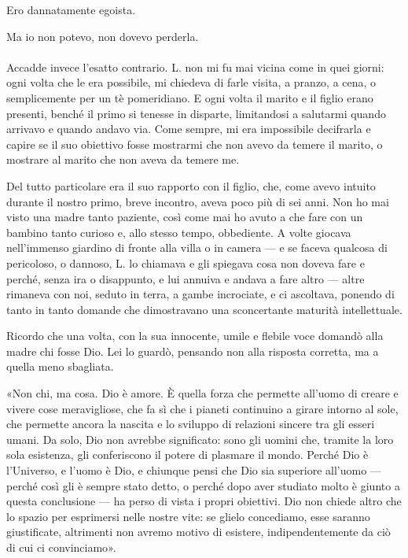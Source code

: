 \documentclass[a4paper,12pt]{book}
\begin{document}
Ero dannatamente egoista.

Ma io non potevo, non dovevo perderla.

\paragraph{}
Accadde invece l'esatto contrario. L. non mi fu mai vicina come in quei giorni:
ogni volta che le era possibile, mi chiedeva di farle visita, a pranzo, a cena,
o semplicemente per un tè pomeridiano. E ogni volta il marito e il figlio erano
presenti, benché il primo si tenesse in disparte, limitandosi a salutarmi quando
arrivavo e quando andavo via. Come sempre, mi era impossibile decifrarla e capire
se il suo obiettivo fosse mostrarmi che non avevo da temere il marito, o mostrare
al marito che non aveva da temere me.

Del tutto particolare era il suo rapporto con il figlio, che, come avevo intuito
durante il nostro primo, breve incontro, aveva poco più di sei anni. Non ho mai
visto una madre tanto paziente, così come mai ho avuto a che fare con un bambino
tanto curioso e, allo stesso tempo, obbediente. A volte giocava nell'immenso
giardino di fronte alla villa o in camera --- e se faceva qualcosa di pericoloso,
o dannoso, L. lo chiamava e gli spiegava cosa non doveva fare e perché, senza
ira o disappunto, e lui annuiva e andava a fare altro --- altre rimaneva con noi,
seduto in terra, a gambe incrociate, e ci ascoltava, ponendo di tanto in tanto
domande che dimostravano una sconcertante maturità intellettuale.

Ricordo che una volta, con la sua innocente, umile e flebile voce domandò alla
madre chi fosse Dio. Lei lo guardò, pensando non alla risposta corretta, ma a
quella meno sbagliata.

«Non chi, ma cosa. Dio è amore. È quella forza che permette all'uomo di creare
e vivere cose meravigliose, che fa sì che i pianeti continuino a girare intorno
al sole, che permette ancora la nascita e lo sviluppo di relazioni sincere tra
gli esseri umani. Da solo, Dio non avrebbe significato: sono gli uomini che,
tramite la loro sola esistenza, gli conferiscono il potere di plasmare il mondo.
Perché Dio è l'Universo, e l'uomo è Dio, e chiunque pensi che Dio sia superiore
all'uomo --- perché così gli è sempre stato detto, o perché dopo aver studiato
molto è giunto a questa conclusione --- ha perso di vista i propri obiettivi.
Dio non chiede altro che lo spazio per esprimersi nelle nostre vite: se glielo
concediamo, esse saranno giustificate, altrimenti non avremo motivo di esistere,
indipendentemente da ciò di cui ci convinciamo».
\end{document}
